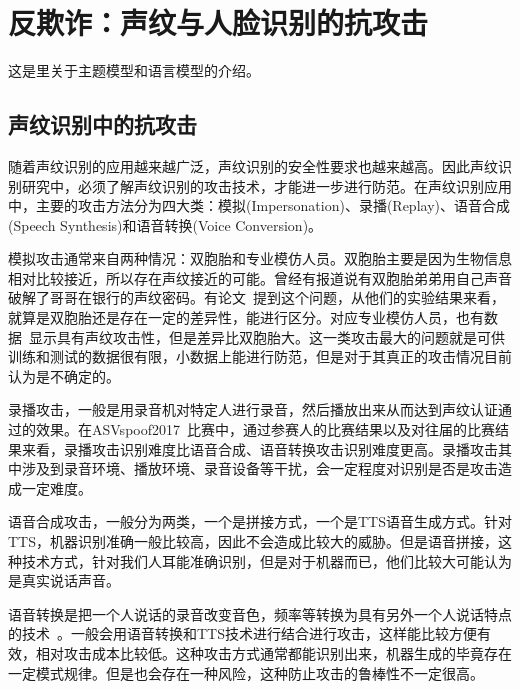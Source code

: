 %
%
%
\chapter{反欺诈：声纹与人脸识别的抗攻击}
\label{basic} %


这是里关于主题模型和语言模型的介绍。

\section{声纹识别中的抗攻击}

随着声纹识别的应用越来越广泛，声纹识别的安全性要求也越来越高。因此声纹识别研究中，必须了解声纹识别的攻击技术，才能进一步进行防范。在声纹识别应用中，主要的攻击方法分为四大类：模拟(Impersonation)、录播(Replay)、语音合成(Speech Synthesis)和语音转换(Voice Conversion)。

模拟攻击通常来自两种情况：双胞胎和专业模仿人员。双胞胎主要是因为生物信息相对比较接近，所以存在声纹接近的可能。曾经有报道说有双胞胎弟弟用自己声音破解了哥哥在银行的声纹密码。有论文~\cite{patil2005speaker}提到这个问题，从他们的实验结果来看，就算是双胞胎还是存在一定的差异性，能进行区分。对应专业模仿人员，也有数据~\cite{patil2008lp}显示具有声纹攻击性，但是差异比双胞胎大。这一类攻击最大的问题就是可供训练和测试的数据很有限，小数据上能进行防范，但是对于其真正的攻击情况目前认为是不确定的。

录播攻击，一般是用录音机对特定人进行录音，然后播放出来从而达到声纹认证通过的效果。在ASVspoof2017~\cite{kinnunen2017asvspoof}比赛中，通过参赛人的比赛结果以及对往届的比赛结果来看，录播攻击识别难度比语音合成、语音转换攻击识别难度更高。录播攻击其中涉及到录音环境、播放环境、录音设备等干扰，会一定程度对识别是否是攻击造成一定难度。

语音合成攻击，一般分为两类，一个是拼接方式，一个是TTS语音生成方式。针对TTS，机器识别准确一般比较高，因此不会造成比较大的威胁。但是语音拼接，这种技术方式，针对我们人耳能准确识别，但是对于机器而已，他们比较大可能认为是真实说话声音。

语音转换是把一个人说话的录音改变音色，频率等转换为具有另外一个人说话特点的技术~\cite{jia2018transfer}。一般会用语音转换和TTS技术进行结合进行攻击，这样能比较方便有效，相对攻击成本比较低。这种攻击方式通常都能识别出来，机器生成的毕竟存在一定模式规律。但是也会存在一种风险，这种防止攻击的鲁棒性不一定很高。

